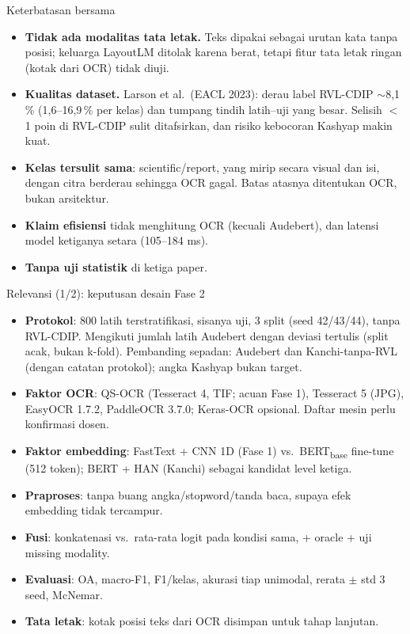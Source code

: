 \documentclass[aspectratio=169,10pt]{beamer}
\newcommand\kecil{\fontsize{8}{9.5}\selectfont}
\begin{document}
\begin{frame}{Keterbatasan bersama}
  \begin{itemize}
    \item \textbf{Tidak ada modalitas tata letak.} Teks dipakai sebagai urutan kata tanpa posisi;
          keluarga LayoutLM ditolak karena berat, tetapi fitur tata letak ringan (kotak dari OCR)
          tidak diuji.
    \item \textbf{Kualitas dataset.} Larson et al.\ (EACL 2023): derau label RVL-CDIP $\sim$8,1\,\%
          (1,6--16,9\,\% per kelas) dan tumpang tindih latih--uji yang besar. Selisih $<$1 poin di
          RVL-CDIP sulit ditafsirkan, dan risiko kebocoran Kashyap makin kuat.
    \item \textbf{Kelas tersulit sama}: scientific/report, yang mirip secara visual dan isi, dengan
          citra berderau sehingga OCR gagal. Batas atasnya ditentukan OCR, bukan arsitektur.
    \item \textbf{Klaim efisiensi} tidak menghitung OCR (kecuali Audebert), dan latensi model
          ketiganya setara (105--184 ms).
    \item \textbf{Tanpa uji statistik} di ketiga paper.
  \end{itemize}
\end{frame}

\begin{frame}{Relevansi (1/2): keputusan desain Fase 2}
  \kecil
  \begin{itemize}
    \item \textbf{Protokol}: 800 latih terstratifikasi, sisanya uji, 3 split (seed 42/43/44), tanpa RVL-CDIP.
          Mengikuti jumlah latih Audebert dengan deviasi tertulis (split acak, bukan k-fold).
          Pembanding sepadan: Audebert dan Kanchi-tanpa-RVL (dengan catatan protokol); angka Kashyap bukan target.
    \item \textbf{Faktor OCR}: QS-OCR (Tesseract 4, TIF; acuan Fase 1), Tesseract 5 (JPG), EasyOCR 1.7.2,
          PaddleOCR 3.7.0; Keras-OCR opsional. \alert{Daftar mesin perlu konfirmasi dosen.}
    \item \textbf{Faktor embedding}: FastText + CNN 1D (Fase 1) vs.\ BERT\textsubscript{base} fine-tune (512 token);
          BERT + HAN (Kanchi) sebagai kandidat level ketiga.
    \item \textbf{Praproses}: tanpa buang angka/stopword/tanda baca, supaya efek embedding tidak tercampur.
    \item \textbf{Fusi}: konkatenasi vs.\ rata-rata logit pada kondisi sama, + oracle + uji missing modality.
    \item \textbf{Evaluasi}: OA, macro-F1, F1/kelas, \alert{akurasi tiap unimodal}, rerata $\pm$ std 3 seed, McNemar.
    \item \textbf{Tata letak}: kotak posisi teks dari OCR disimpan untuk tahap lanjutan.
  \end{itemize}
\end{frame}
\end{document}
